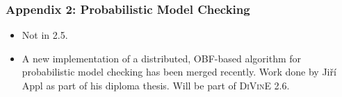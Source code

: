\documentclass{beamer}
\newcommand{\divine}{\textsc{Di\hspace*{-1pt}V\hspace*{-1pt}inE}\xspace}
\begin{document}
\begin{frame}[fragile]
  \frametitle{Appendix 2: Probabilistic Model Checking}
  \begin{itemize}
    \item Not in 2.5.
    \item A new implementation of a distributed, OBF-based algorithm for
      probabilistic model checking has been merged recently. Work done by Jiří
      Appl as part of his diploma thesis. Will be part of \divine 2.6.
  \end{itemize}
\end{frame}
\end{document}
